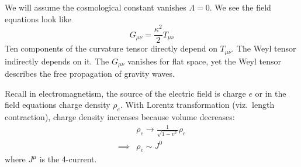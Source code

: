 We will assume the cosmological constant vanishes $\Lambda=0$. We
see the field equations look like
\begin{equation}
G_{\mu\nu}=\frac{\kappa^{2}}{2}T_{\mu\nu}
\end{equation}
Ten components of the curvature tensor directly depend on $T_{\mu\nu}$.
The Weyl tensor indirectly depends on it. The $G_{\mu\nu}$
vanishes for flat space, yet the Weyl tensor describes the free
propagation of gravity waves.

Recall in electromagnetism, the source of the electric field is
charge $e$ or in the field equations charge density
$\rho_{e}$. With Lorentz transformation (viz.~length
contraction), charge density increases because volume decreases:
\begin{equation}
\begin{split}
&\rho_{e}\to\frac{1}{\sqrt{1-v^{2}}}\rho_{e}\\
\implies&\rho_{e}\sim J^{0}
\end{split}
\end{equation}
where $J^{\mu}$ is the 4-current.

